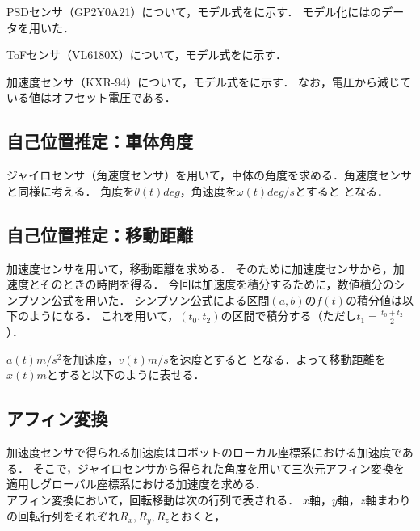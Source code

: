 \documentclass[11pt,a4]{jsarticle}
\begin{document}
    PSDセンサ（GP2Y0A21）について，モデル式をに示す．
    モデル化にはのデータを用いた．

    ToFセンサ（VL6180X）について，モデル式をに示す．

    加速度センサ（KXR-94）について，モデル式をに示す．
    なお，電圧から減じている値はオフセット電圧である．

  \subsection{自己位置推定：車体角度}
    ジャイロセンサ（角速度センサ）を用いて，車体の角度を求める．角速度センサと同様に考える．
    角度を$\theta(t)\unit{deg}$，角速度を$\omega(t)\unit{deg/s}$とすると
    となる．

  \subsection{自己位置推定：移動距離}
    加速度センサを用いて，移動距離を求める．
    そのために加速度センサから，加速度とそのときの時間を得る．
    今回は加速度を積分するために，数値積分のシンプソン公式を用いた．
    シンプソン公式による区間$(a,b)$の$f(t)$の積分値は以下のようになる．
    これを用いて，$(t_0,t_2)$の区間で積分する（ただし$t_1=\frac{t_0+t_2}{2}$）．

    $a(t)\unit{m/s^2}$を加速度，$v(t)\unit{m/s}$を速度とすると
    となる．よって移動距離を$x(t)\unit{m}$とすると以下のように表せる．

  \subsection{アフィン変換}
     加速度センサで得られる加速度はロボットのローカル座標系における加速度である．
     そこで，ジャイロセンサから得られた角度を用いて三次元アフィン変換を適用しグローバル座標系における加速度を求める．\\
     アフィン変換において，回転移動は次の行列で表される．
     $x$軸，$y$軸，$z$軸まわりの回転行列をそれぞれ$R_x, R_y, R_z$とおくと，
\end{document}
